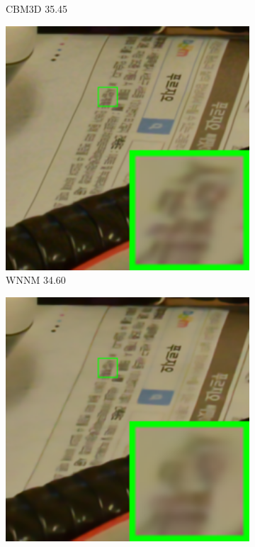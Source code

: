 \begin{figure}
\begin{subfigure}[t]{0.19\textwidth}
		\caption{CBM3D 35.45}
    \end{subfigure}
    \hfill
    \begin{subfigure}[t]{0.19\textwidth}
        \centering
        \includegraphics[width=1\textwidth]{images/guided/cc60/resize_br_WNNM_CC_Noisy_Nikon_D800_ISO_3200_A1_111.png}
\caption{WNNM 34.60}
    \end{subfigure}
    \hfill
    \begin{subfigure}[t]{0.19\textwidth}
        \centering
        \includegraphics[width=1\textwidth]{images/guided/cc60/resize_br_CSF_CC_Noisy_Nikon_D800_ISO_3200_A1_111.png}

\end{subfigure}
\end{figure}

